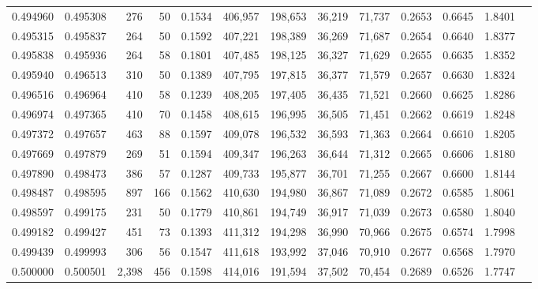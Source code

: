 \begin{tabular}{rrrrrrrrrrrrr}
0.494960 & 0.495308 &   276 &  50 &                                     0.1534 & 406,957 & 198,653 &  36,219 &  71,737 & 0.2653 & 0.6645 & 1.8401 \\
0.495315 & 0.495837 &   264 &  50 &                                     0.1592 & 407,221 & 198,389 &  36,269 &  71,687 & 0.2654 & 0.6640 & 1.8377 \\
0.495838 & 0.495936 &   264 &  58 &                                     0.1801 & 407,485 & 198,125 &  36,327 &  71,629 & 0.2655 & 0.6635 & 1.8352 \\
0.495940 & 0.496513 &   310 &  50 &                                     0.1389 & 407,795 & 197,815 &  36,377 &  71,579 & 0.2657 & 0.6630 & 1.8324 \\
0.496516 & 0.496964 &   410 &  58 &                                     0.1239 & 408,205 & 197,405 &  36,435 &  71,521 & 0.2660 & 0.6625 & 1.8286 \\
0.496974 & 0.497365 &   410 &  70 &                                     0.1458 & 408,615 & 196,995 &  36,505 &  71,451 & 0.2662 & 0.6619 & 1.8248 \\
0.497372 & 0.497657 &   463 &  88 &                                     0.1597 & 409,078 & 196,532 &  36,593 &  71,363 & 0.2664 & 0.6610 & 1.8205 \\
0.497669 & 0.497879 &   269 &  51 &                                     0.1594 & 409,347 & 196,263 &  36,644 &  71,312 & 0.2665 & 0.6606 & 1.8180 \\
0.497890 & 0.498473 &   386 &  57 &                                     0.1287 & 409,733 & 195,877 &  36,701 &  71,255 & 0.2667 & 0.6600 & 1.8144 \\
0.498487 & 0.498595 &   897 & 166 &                                     0.1562 & 410,630 & 194,980 &  36,867 &  71,089 & 0.2672 & 0.6585 & 1.8061 \\
0.498597 & 0.499175 &   231 &  50 &                                     0.1779 & 410,861 & 194,749 &  36,917 &  71,039 & 0.2673 & 0.6580 & 1.8040 \\
0.499182 & 0.499427 &   451 &  73 &                                     0.1393 & 411,312 & 194,298 &  36,990 &  70,966 & 0.2675 & 0.6574 & 1.7998 \\
0.499439 & 0.499993 &   306 &  56 &                                     0.1547 & 411,618 & 193,992 &  37,046 &  70,910 & 0.2677 & 0.6568 & 1.7970 \\
0.500000 & 0.500501 & 2,398 & 456 &                                     0.1598 & 414,016 & 191,594 &  37,502 &  70,454 & 0.2689 & 0.6526 & 1.7747 \\

\end{tabular}
